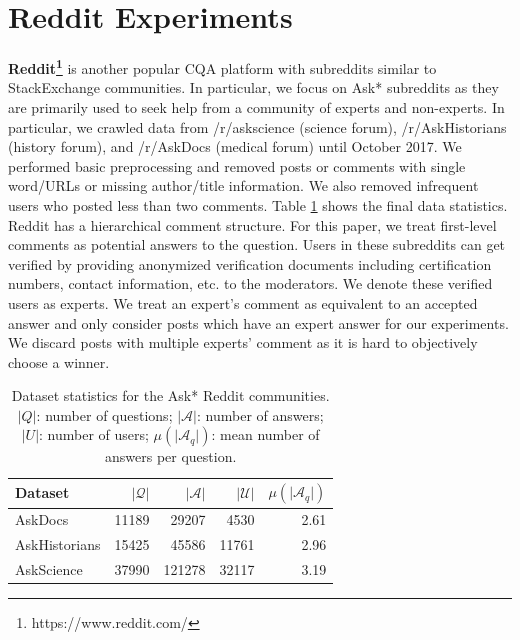 \documentclass[smallcondensed]{svjour3}     %
\begin{document}
\section{Reddit Experiments}
\textbf{Reddit\footnote{https://www.reddit.com/}} is another popular CQA platform with subreddits similar to StackExchange communities. In particular, we focus on Ask* subreddits as they are primarily used to seek help from a community of experts and non-experts. In particular, we crawled data from /r/askscience (science forum), /r/AskHistorians (history forum), and /r/AskDocs (medical forum) until October 2017. We performed basic preprocessing and removed posts or comments with single word/URLs or missing author/title information. We also removed infrequent users who posted less than two comments. Table \ref{tab:redditdata} shows the final data statistics.
Reddit has a hierarchical comment structure. For this paper, we treat first-level comments as potential answers to the question. Users in these subreddits can get verified by providing anonymized verification documents including certification numbers, contact information, etc. to the moderators. We denote these verified users as experts. We treat an expert's comment as equivalent to an accepted answer and only consider posts which have an expert answer for our experiments. We discard posts with multiple experts' comment as it is hard to objectively choose a winner.
\begin{table}[h]
\centering
\begin{tabular}{l  r r r r}
 \toprule
 \textbf{Dataset} & $\vert \mathcal{Q} \vert$ & $\vert \mathcal{A} \vert$ & $\vert \mathcal{U} \vert$ & $ \mu (\vert  \mathcal{A}_q \vert) $ \\  \midrule
 AskDocs & 11189 & 29207& 4530 & 2.61               \\
 AskHistorians & 15425 & 45586 & 11761 & 2.96                     \\
 AskScience & 37990 & 121278 & 32117 & 3.19                 \\
  \bottomrule
\end{tabular}
  \caption{\label{tab:redditdata}Dataset statistics for the Ask* Reddit communities. $\vert Q \vert$: number of questions; $\vert  \mathcal{A} \vert$: number of answers; $ \vert U \vert $: number of users; $ \mu (\vert  \mathcal{A}_q \vert) $: mean number of answers per question.}
\end{table}
\end{document}
